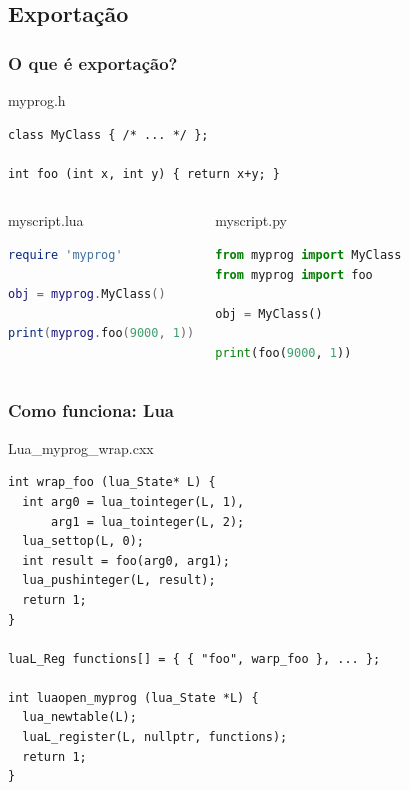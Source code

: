\documentclass[brazil]{beamer}
\begin{document}
\subsection{Exportação}
\begin{frame}[fragile]
  \frametitle{O que é exportação?}
  \pause
  \begin{block}{myprog.h}
    \begin{lstlisting}
class MyClass { /* ... */ };

int foo (int x, int y) { return x+y; }
    \end{lstlisting}
  \end{block}
  \pause
  \begin{columns}
      \begin{block}{myscript.lua}
        \begin{lstlisting}[language=lua]
require 'myprog'

obj = myprog.MyClass()

print(myprog.foo(9000, 1))
        \end{lstlisting}
      \end{block}
    \pause
      \begin{block}{myscript.py}
        \begin{lstlisting}[language=python]
from myprog import MyClass
from myprog import foo

obj = MyClass()

print(foo(9000, 1))
        \end{lstlisting}
      \end{block}
  \end{columns}
\end{frame}
\begin{frame}[fragile]
  \frametitle{Como funciona: Lua}
  \pause
  \begin{block}{Lua\_myprog\_wrap.cxx}
    \begin{lstlisting}
int wrap_foo (lua_State* L) {
  int arg0 = lua_tointeger(L, 1),
      arg1 = lua_tointeger(L, 2);
  lua_settop(L, 0);
  int result = foo(arg0, arg1);
  lua_pushinteger(L, result);
  return 1;
}

luaL_Reg functions[] = { { "foo", warp_foo }, ... };

int luaopen_myprog (lua_State *L) {
  lua_newtable(L);
  luaL_register(L, nullptr, functions);
  return 1;
}
    \end{lstlisting}
  \end{block}
\end{frame}
\end{document}
